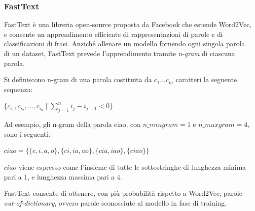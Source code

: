 \subsubsection{FastText}
\label{sec:fasttext}
FastText è una libreria open-source proposta da Facebook che estende Word2Vec, e consente un apprendimento efficiente di rappresentazioni di parole e di classificazioni di frasi.
Anziché allenare un modello fornendo ogni singola parola di un dataset, FastText prevede l'apprendimento tramite \textit{n-gram} di ciascuna parola.

Si definiscono n-gram di una parola costituita da $c_1...c_m$ caratteri la seguente sequenza:
\begin{center}
$\{ c_{i_1}, c_{i_2}, \ldots, c_{i_n} \mid \sum\limits_{j=1}^n i_{j} - i_{j-1} < 0 \}$
\end{center}
Ad esempio, gli n-gram della parola ciao, con $n\_mingram = 1$ e $n\_maxgram = 4$, sono i seguenti:

\begin{center}
    $ciao = \{\{c, i, a, o\},\{ci, ia, ao\}, \{cia, iao\}, \{ciao\}\}$
\end{center}
$ciao$ viene espresso come l'insieme di tutte le sottostringhe di lunghezza minima pari a 1, e lunghezza massima pari a 4.


FastText consente di ottenere, con più probabilità rispetto a Word2Vec, parole \emph{out-of-dictionary}, ovvero parole sconosciute al modello in fase di training.
